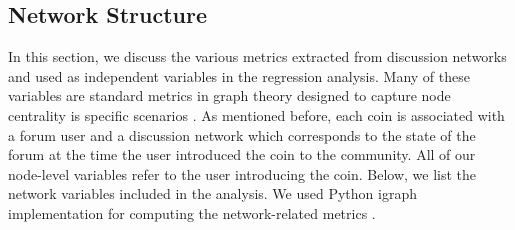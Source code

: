 

\subsection{Network Structure}
In this section, we discuss the various metrics extracted from discussion networks and used as independent variables in the regression analysis. Many of these variables are standard metrics in graph theory designed to capture node centrality is specific scenarios \cite{KleinbergNetworks}. As mentioned before, each coin is associated with a forum user and a discussion network which corresponds to the state of the forum at the time the user introduced the coin to the community. All of our node-level variables refer to the user introducing the coin. Below, we list the network variables included in the analysis. We used Python igraph implementation for computing the network-related metrics \cite{igraph}.
